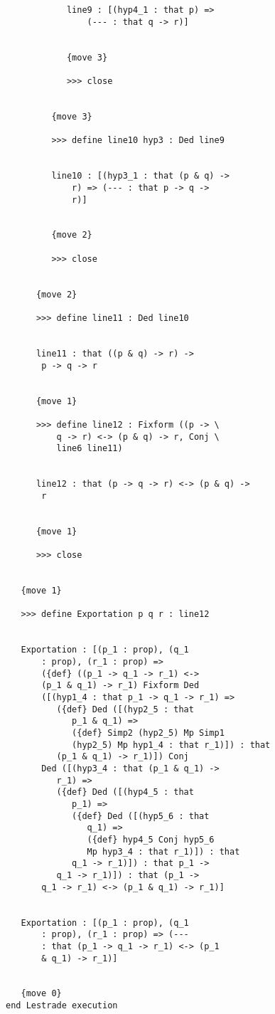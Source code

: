 \documentclass{slides}
\begin{document}
\begin{slide}
{\begin{verbatim}
            line9 : [(hyp4_1 : that p) => 
                (--- : that q -> r)]


            {move 3}

            >>> close


         {move 3}

         >>> define line10 hyp3 : Ded line9


         line10 : [(hyp3_1 : that (p & q) -> 
             r) => (--- : that p -> q -> 
             r)]


         {move 2}

         >>> close


      {move 2}

      >>> define line11 : Ded line10


      line11 : that ((p & q) -> r) -> 
       p -> q -> r


      {move 1}

      >>> define line12 : Fixform ((p -> \
          q -> r) <-> (p & q) -> r, Conj \
          line6 line11)


      line12 : that (p -> q -> r) <-> (p & q) -> 
       r


      {move 1}

      >>> close


   {move 1}

   >>> define Exportation p q r : line12


   Exportation : [(p_1 : prop), (q_1 
       : prop), (r_1 : prop) => 
       ({def} ((p_1 -> q_1 -> r_1) <-> 
       (p_1 & q_1) -> r_1) Fixform Ded 
       ([(hyp1_4 : that p_1 -> q_1 -> r_1) => 
          ({def} Ded ([(hyp2_5 : that 
             p_1 & q_1) => 
             ({def} Simp2 (hyp2_5) Mp Simp1 
             (hyp2_5) Mp hyp1_4 : that r_1)]) : that 
          (p_1 & q_1) -> r_1)]) Conj 
       Ded ([(hyp3_4 : that (p_1 & q_1) -> 
          r_1) => 
          ({def} Ded ([(hyp4_5 : that 
             p_1) => 
             ({def} Ded ([(hyp5_6 : that 
                q_1) => 
                ({def} hyp4_5 Conj hyp5_6 
                Mp hyp3_4 : that r_1)]) : that 
             q_1 -> r_1)]) : that p_1 -> 
          q_1 -> r_1)]) : that (p_1 -> 
       q_1 -> r_1) <-> (p_1 & q_1) -> r_1)]


   Exportation : [(p_1 : prop), (q_1 
       : prop), (r_1 : prop) => (--- 
       : that (p_1 -> q_1 -> r_1) <-> (p_1 
       & q_1) -> r_1)]


   {move 0}
end Lestrade execution


\end{verbatim}
}

\end{slide}
\end{document}

